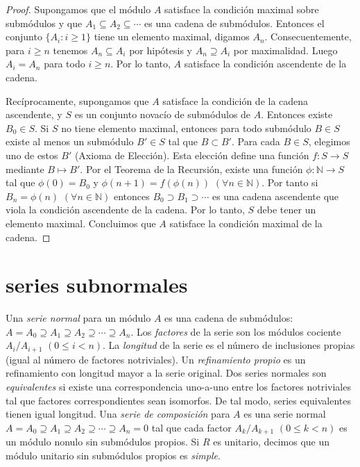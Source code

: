 \documentclass{report}
\newcommand{\naturalNumbers}{\mathbb{N}}
\begin{document}
  \begin{proof}
    Supongamos que el módulo \(A\) satisface la condición maximal sobre submódulos y que \(A_1 \subseteq A_2 \subseteq \cdots\) es una cadena de submódulos.
    Entonces el conjunto \(\{A_i : i \geq 1\}\) tiene un elemento maximal, digamos \(A_n\).
    Consecuentemente, para \(i \geq n\) tenemos \(A_n \subseteq A_i\) por hipótesis y \(A_n \supseteq A_i\) por maximalidad.
    Luego \(A_i = A_n\) para todo \(i \geq n\).
    Por lo tanto, \(A\) satisface la condición ascendente de la cadena.

    Recíprocamente, supongamos que \(A\) satisface la condición de la cadena ascendente, y \(S\) es un conjunto novacío de submódulos de \(A\).
    Entonces existe \(B_0 \in S\).
    Si \(S\) no tiene elemento maximal, entonces para todo submódulo \(B \in S\) existe al menos un submódulo \(B' \in S\) tal que \(B \subset B'\).
    Para cada \(B \in S\), elegimos uno de estos \(B'\) (Axioma de Elección).
    Esta elección define una función \(f : S \rightarrow S\) mediante \(B \mapsto B'\).
    Por el Teorema de la Recursión, existe una función \(\phi : \naturalNumbers \rightarrow S\) tal que \(\phi(0) = B_0\) y \(\phi(n + 1) = f(\phi(n))\) \((\forall n \in \naturalNumbers)\).
    Por tanto si \(B_n = \phi(n)\) \((\forall n \in \naturalNumbers)\) entonces \(B_0 \supset B_1 \supset \cdots\) es una cadena ascendente que viola la condición ascendente de la cadena.
    Por lo tanto, \(S\) debe tener un elemento maximal.
    Concluimos que \(A\) satisface la condición maximal de la cadena.
  \end{proof}

  \section{series subnormales}

  Una \emph{serie normal} para un módulo \(A\) es una cadena de submódulos:
  \(A = A_0 \supseteq A_1 \supseteq A_2 \supseteq \cdots \supseteq A_n\).
  Los \emph{factores} de la serie son los módulos cociente \(A_i / A_{i + 1}\) \((0 \leq i < n)\).
  La \emph{longitud} de la serie es el número de inclusiones propias (igual al número de factores notriviales).
  Un \emph{refinamiento propio} es un refinamiento con longitud mayor a la serie original.
  Dos series normales son \emph{equivalentes} si existe una correspondencia uno-a-uno entre los factores notriviales tal que factores correspondientes sean isomorfos.
  De tal modo, series equivalentes tienen igual longitud.
  Una \emph{serie de composición} para \(A\) es una serie normal
  \(A = A_0 \supseteq A_1 \supseteq A_2 \supseteq \cdots \supseteq A_n = 0\)
  tal que cada factor \(A_k / A_{k + 1}\) \((0 \leq k < n)\) es un módulo nonulo sin submódulos propios.
  Si \(R\) es unitario, decimos que un módulo unitario sin submódulos propios es \emph{simple}.
\end{document}
